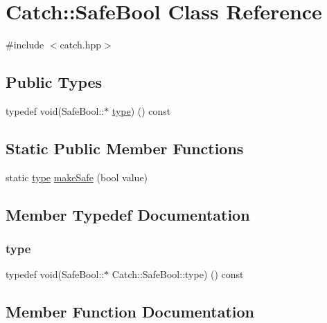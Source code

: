\hypertarget{class_catch_1_1_safe_bool}{}\section{Catch\+:\+:Safe\+Bool Class Reference}
\label{class_catch_1_1_safe_bool}


{\ttfamily \#include $<$catch.\+hpp$>$}

\subsection*{Public Types}
\begin{DoxyCompactItemize}
\item 
typedef void(Safe\+Bool\+::$\ast$ \hyperlink{class_catch_1_1_safe_bool_a39eef9baed296299d625a54d54a2a958}{type}) () const
\end{DoxyCompactItemize}
\subsection*{Static Public Member Functions}
\begin{DoxyCompactItemize}
\item 
static \hyperlink{class_catch_1_1_safe_bool_a39eef9baed296299d625a54d54a2a958}{type} \hyperlink{class_catch_1_1_safe_bool_af0ea63d9820f8bf7a8b76377913c4e77}{make\+Safe} (bool value)
\end{DoxyCompactItemize}


\subsection{Member Typedef Documentation}
\hypertarget{class_catch_1_1_safe_bool_a39eef9baed296299d625a54d54a2a958}{}\label{class_catch_1_1_safe_bool_a39eef9baed296299d625a54d54a2a958} 
\subsubsection{\texorpdfstring{type}{type}}
{\footnotesize\ttfamily typedef void(Safe\+Bool\+::$\ast$ Catch\+::\+Safe\+Bool\+::type) () const}



\subsection{Member Function Documentation}
\hypertarget{class_catch_1_1_safe_bool_af0ea63d9820f8bf7a8b76377913c4e77}{}\label{class_catch_1_1_safe_bool_af0ea63d9820f8bf7a8b76377913c4e77} 
